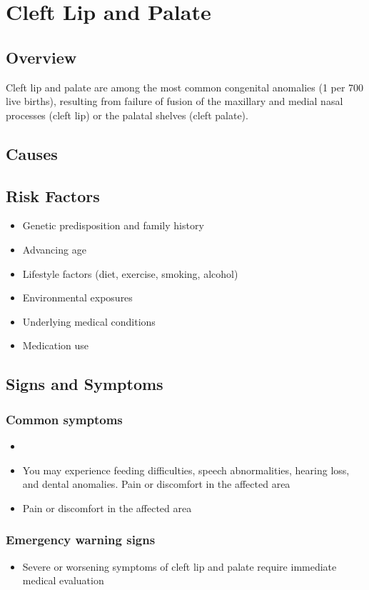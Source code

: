 \chapter{Cleft Lip and Palate}
\label{sec:Cleft Lip and Palate}

\section{Overview}
Cleft lip and palate are among the most common congenital anomalies (1 per 700 live births), resulting from failure of fusion of the maxillary and medial nasal processes (cleft lip) or the palatal shelves (cleft palate).
\section{Causes}
\section{Risk Factors}

\begin{itemize}[noitemsep]
  \item Genetic predisposition and family history
  \item Advancing age
  \item Lifestyle factors (diet, exercise, smoking, alcohol)
  \item Environmental exposures
  \item Underlying medical conditions
  \item Medication use
\end{itemize}
\section{Signs and Symptoms}

\subsection{Common symptoms}
\begin{itemize}[noitemsep]
  \item \item You may experience feeding difficulties, speech abnormalities, hearing loss, and dental anomalies. Pain or discomfort in the affected area    \item Pain or discomfort in the affected area
  \end{itemize}

\subsection{Emergency warning signs}
\begin{itemize}[noitemsep]
  \item Severe or worsening symptoms of cleft lip and palate require immediate medical evaluation
\end{itemize}
